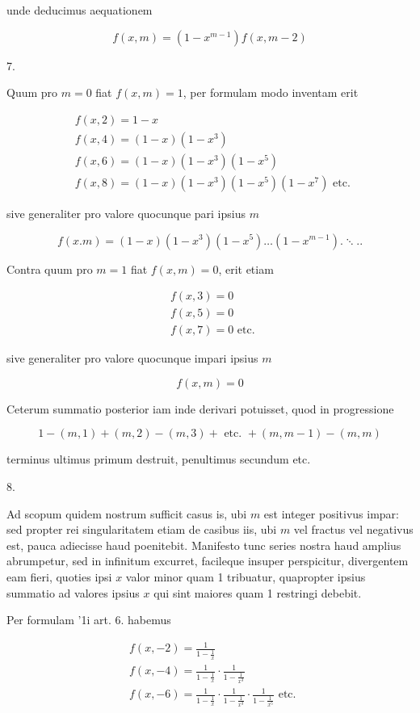 \documentclass[10pt]{article}
\begin{document}
unde deducimus aequationem

\[
f(x, m)=\left(1-x^{m-1}\right) f(x, m-2)
\]

7.

Quum pro \(m=0\) fiat \(f(x, m)=1\), per formulam modo inventam erit

\[
\begin{aligned}
& f(x, 2)=1-x \\
& f(x, 4)=(1-x)\left(1-x^{3}\right) \\
& f(x, 6)=(1-x)\left(1-x^{3}\right)\left(1-x^{5}\right) \\
& f(x, 8)=(1-x)\left(1-x^{3}\right)\left(1-x^{5}\right)\left(1-x^{7}\right) \text { etc. }
\end{aligned}
\]

sive generaliter pro valore quocunque pari ipsius \(m\)

\[
f(x . m)=(1-x)\left(1-x^{3}\right)\left(1-x^{5}\right) \ldots\left(1-x^{m-1}\right) . \ddots . .
\]

Contra quum pro \(m=1\) fiat \(f(x, m)=0\), erit etiam

\[
\begin{aligned}
& f(x, 3)=0 \\
& f(x, 5)=0 \\
& f(x, 7)=0 \text { etc. }
\end{aligned}
\]

sive generaliter pro valore quocunque impari ipsius \(m\)

\[
f(x, m)=0
\]

Ceterum summatio posterior iam inde derivari potuisset, quod in progressione

\[
1-(m, 1)+(m, 2)-(m, 3)+\text { etc. }+(m, m-1)-(m, m)
\]

terminus ultimus primum destruit, penultimus secundum etc.

8.

Ad scopum quidem nostrum sufficit casus is, ubi \(m\) est integer positivus impar: sed propter rei singularitatem etiam de casibus iis, ubi \(m\) vel fractus vel negativus est, pauca adiecisse haud poenitebit. Manifesto tunc series nostra haud amplius abrumpetur, sed in infinitum excurret, facileque insuper perspicitur, divergentem eam fieri, quoties ipsi \(x\) valor minor quam 1 tribuatur, quapropter ipsius summatio ad valores ipsius \(x\) qui sint maiores quam 1 restringi debebit.

Per formulam '1i art. 6. habemus

\[
\begin{aligned}
& f(x,-2)=\frac{1}{1-\frac{1}{x}} \\
& f(x,-4)=\frac{1}{1-\frac{1}{x}} \cdot \frac{1}{1-\frac{1}{x^{3}}} \\
& f(x,-6)=\frac{1}{1-\frac{1}{x}} \cdot \frac{1}{1-\frac{1}{x^{3}}} \cdot \frac{1}{1-\frac{1}{x^{5}}} \text { etc. }
\end{aligned}
\]
\end{document}
